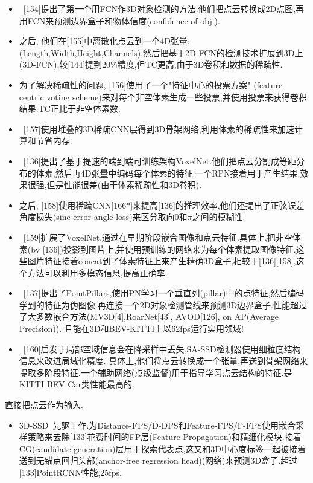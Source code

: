 \documentclass{article}
\begin{document}
\begin{itemize}
    \item \ [154]提出了第一个用FCN作3D对象检测的方法.他们把点云转换成2D点图,再用FCN来预测边界盒子和物体信度(confidence of obj.).
    \item 之后, 他们在[155]中离散化点云到一个4D张量:(Length,Width,Height,Channels),然后把基于2D-FCN的检测技术扩展到3D上(3D-FCN),较[144]提到20\%精度,但TC更高,由于3D卷积和数据的稀疏性.
    \item 为了解决稀疏性的问题, [156]使用了一个"特征中心的投票方案" (feature-centric voting scheme)来对每个非空体素生成一些投票,并使用投票来获得卷积结果.TC正比于非空体素数.
    \item \ [157]使用堆叠的3D稀疏CNN层得到3D骨架网络,利用体素的稀疏性来加速计算和节省内存.
    \item \ [136]提出了基于提速的端到端可训练架构VoxelNet.他们把点云分割成等距分布的体素,然后再4D张量中编码每个体素的特征.一个RPN接着用于产生结果.效果很强,但是性能很差(由于体素稀疏性和3D卷积).
    \item 之后, [158]使用稀疏CNN[166*]来提高[136]的推理效率,他们还提出了正弦误差角度损失(sine-error angle loss)来区分取向$0$和$\pi$之间的模糊性.
    \item \ [159]扩展了VoxelNet,通过在早期阶段嵌合图像和点云特征.具体上,把非空体素(by [136])投影到图片上,并使用预训练的网络来为每个体素提取图像特征.这些图片特征接着concat到了体素特征上来产生精确3D盒子,相较于[136][158],这个方法可以利用多模态信息,提高正确率.
    \item \ [137]提出了PointPillars,使用PN学习一个垂直列(pillar)中的点特征,然后编码学到的特征为伪图像.再连接一个2D对象检测管线来预测3D边界盒子.性能超过了大多数嵌合方法(MV3D[4],RoarNet[43], AVOD[126], on AP(Average Precision)). 且能在3D和BEV-KITTI上以62fps运行\trarr 实用领域!
    \item \ [160]启发于局部空域信息会在降采样中丢失,SA-SSD检测器使用细粒度结构信息来改进局域化精度. 具体上,他们将点云转换成一个张量,再送到骨架网络来提取多阶段特征.一个辅助网络(点级监督)用于指导学习点云结构的特征.是KITTI BEV Car类性能最高的.
\end{itemize}

 直接把点云作为输入.

\begin{itemize}
    \item 3D-SSD~先驱工作.为Distance-FPS/D-DPS和Feature-FPS/F-FPS使用嵌合采样策略来去除[133]花费时间的FP层(Feature Propagation)和精细化模块.接着CG(candidate generation)层用于探索代表点,这又和3D中心度标签一起被接着送到无锚点回归头部(anchor-free regression head)(网络)来预测3D盒子.超过[133]PointRCNN性能,25fps.
\end{itemize}
\end{document}
